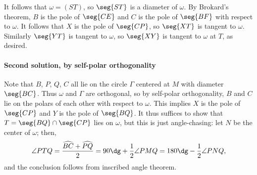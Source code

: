 It follows that $\omega=(ST)$, so $\seg{ST}$ is a diameter of $\omega$. By Brokard's theorem, $B$ is the pole of $\seg{CE}$ and $C$ is the pole of $\seg{BF}$ with respect to $\omega$. It follows that $X$ is the pole of $\seg{CP}$, so $\seg{XT}$ is tangent to $\omega$. Similarly $\seg{YT}$ is tangent to $\omega$, so $\seg{XY}$ is tangent to $\omega$ at $T$, as desired.

\paragraph{Second solution, by self-polar orthogonality}     Note that $B$, $P$, $Q$, $C$ all lie on the circle $\Gamma$ centered at $M$ with diameter $\seg{BC}$. Thus $\omega$ and $\Gamma$ are orthogonal, so by self-polar orthogonality, $B$ and $C$ lie on the polars of each other with respect to $\omega$. This implies $X$ is the pole of $\seg{CP}$ and $Y$ is the pole of $\seg{BQ}$. It thus suffices to show that $T=\seg{BQ}\cap\seg{CP}$ lies on $\omega$, but this is just angle-chasing: let $N$ be the center of $\omega$; then, \[\angle PTQ=\frac{\widehat{BC}+\widehat{PQ}}2=90\dg+\frac12\angle PMQ=180\dg-\frac12\angle PNQ,\]
and the conclusion follows from inscribed angle theorem.


